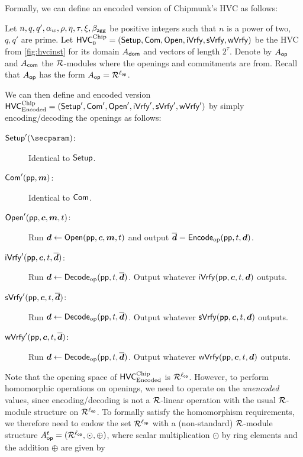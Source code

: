 Formally, we can define an encoded version of Chipmunk's HVC as follows:
\begin{definition}\label{def:encodedhvc}
Let $n,q,q',\alpha_w,\rho,\eta,\tau,\xi,\beta_{\mathsf{agg}}$ be positive integers such that $n$ is a power of two, $q,q'$ are prime.
Let $\mathsf{HVC}^{\textup{Chip}}_{0} = (\mathsf{Setup},\mathsf{Com},\mathsf{Open},\mathsf{iVrfy},\mathsf{sVrfy}, \mathsf{wVrfy})$ be the HVC from \autoref{fig:hvcinst} for its domain $A_{\mathsf{dom}}$ and vectors of length $2^\tau$.
Denote by $A_{\mathsf{op}}$ and $A_{\mathsf{com}}$ the $\mathcal{R}$-modules where the openings and commitments are from.
Recall that $A_{\mathsf{op}}$ has the form $A_{\mathsf{op}} = \mathcal{R}^{\ell_{\mathsf{op}}}$.

We can then define and encoded version $\mathsf{HVC}_{\textup{Encoded}}^{\textup{Chip}} = (\mathsf{Setup}',\mathsf{Com}',\mathsf{Open}',\mathsf{iVrfy}',\mathsf{sVrfy}', \mathsf{wVrfy}')$ by simply encoding/decoding the openings as follows:
\begin{description}
    \item[$\setup'(\secparam)$:] Identical to $\mathsf{Setup}$.
    \item[$\mathsf{Com}'(\mathsf{pp}, \boldsymbol{m})$:] Identical to $\mathsf{Com}$.
    \item[$\mathsf{Open}'(\mathsf{pp},\boldsymbol{c},\boldsymbol{m},t)$:] Run $\boldsymbol{d}\gets\mathsf{Open}(\mathsf{pp},\boldsymbol{c},\boldsymbol{m},t)$ and output $\overline{\boldsymbol{d}} = \mathsf{Encode}_{\mathrm{op}}(\mathsf{pp}, t, \boldsymbol{d})$.
    \item[$\mathsf{iVrfy}'(\mathsf{pp}, \boldsymbol{c},t,\overline{\boldsymbol{d}})$:] Run $\boldsymbol{d}\gets\mathsf{Decode}_{\mathrm{op}}(\mathsf{pp},t,\overline{\boldsymbol{d}})$. Output whatever $\mathsf{iVrfy}(\mathsf{pp},\boldsymbol{c},t,\boldsymbol{d})$ outputs.
    \item[$\mathsf{sVrfy}'(\mathsf{pp}, \boldsymbol{c},t,\overline{\boldsymbol{d}})$:] Run $\boldsymbol{d}\gets\mathsf{Decode}_{\mathrm{op}}(\mathsf{pp},t,\overline{\boldsymbol{d}})$. Output whatever $\mathsf{sVrfy}(\mathsf{pp},\boldsymbol{c},t,\boldsymbol{d})$ outputs.
    \item[$\mathsf{wVrfy}'(\mathsf{pp}, \boldsymbol{c},t,\overline{\boldsymbol{d}})$:] Run $\boldsymbol{d}\gets\mathsf{Decode}_{\mathrm{op}}(\mathsf{pp},t,\overline{\boldsymbol{d}})$. Output whatever $\mathsf{wVrfy}(\mathsf{pp},\boldsymbol{c},t,\boldsymbol{d})$ outputs.
\end{description}
\end{definition}
Note that the opening space of $\mathsf{HVC}_{\textup{Encoded}}^{\textup{Chip}}$ is $\mathcal{R}^{\ell_{\mathsf{op}}}$.
However, to perform homomorphic operations on openings, we need to operate on the \emph{unencoded} values, since encoding/decoding is not a $\mathcal{R}$-linear operation with the usual $\mathcal{R}$-module structure on $\mathcal{R}^{\ell_{\mathsf{op}}}$.
To formally satisfy the homomorphism requirements, we therefore need to endow the set $\mathcal{R}^{\ell_{\mathsf{op}}}$ with a (non-standard) $\mathcal{R}$-module structure $A_{\mathsf{op}}^{t} = (\mathcal{R}^{\ell_{\mathsf{op}}}, \odot, \oplus)$, where scalar multiplication $\odot$ by ring elements and the addition $\oplus$ are given by

